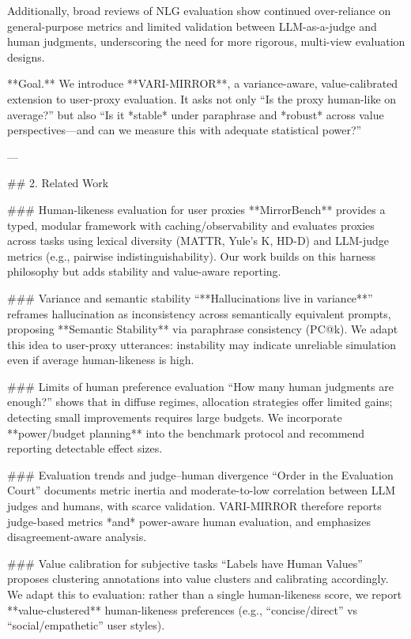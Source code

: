 Additionally, broad reviews of NLG evaluation show continued over-reliance on general-purpose metrics and limited validation between LLM-as-a-judge and human judgments, underscoring the need for more rigorous, multi-view evaluation designs.

**Goal.** We introduce **VARI-MIRROR**, a variance-aware, value-calibrated extension to user-proxy evaluation. It asks not only “Is the proxy human-like on average?” but also “Is it *stable* under paraphrase and *robust* across value perspectives—and can we measure this with adequate statistical power?”

---

## 2. Related Work  

### Human-likeness evaluation for user proxies  
**MirrorBench** provides a typed, modular framework with caching/observability and evaluates proxies across tasks using lexical diversity (MATTR, Yule’s K, HD-D) and LLM-judge metrics (e.g., pairwise indistinguishability). Our work builds on this harness philosophy but adds stability and value-aware reporting.

### Variance and semantic stability  
“**Hallucinations live in variance**” reframes hallucination as inconsistency across semantically equivalent prompts, proposing **Semantic Stability** via paraphrase consistency (PC@k). We adapt this idea to user-proxy utterances: instability may indicate unreliable simulation even if average human-likeness is high.

### Limits of human preference evaluation  
“How many human judgments are enough?” shows that in diffuse regimes, allocation strategies offer limited gains; detecting small improvements requires large budgets. We incorporate **power/budget planning** into the benchmark protocol and recommend reporting detectable effect sizes.

### Evaluation trends and judge–human divergence  
“Order in the Evaluation Court” documents metric inertia and moderate-to-low correlation between LLM judges and humans, with scarce validation. VARI-MIRROR therefore reports judge-based metrics *and* power-aware human evaluation, and emphasizes disagreement-aware analysis.

### Value calibration for subjective tasks  
“Labels have Human Values” proposes clustering annotations into value clusters and calibrating accordingly. We adapt this to evaluation: rather than a single human-likeness score, we report **value-clustered** human-likeness preferences (e.g., “concise/direct” vs “social/empathetic” user styles).

